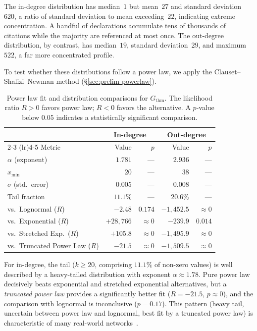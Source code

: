The in-degree distribution has median~$1$ but mean~$27$ and standard deviation~$620$, a ratio of standard deviation to mean exceeding~$22$, indicating extreme concentration. A handful of declarations accumulate tens of thousands of citations while the majority are referenced at most once. The out-degree distribution, by contrast, has median~$19$, standard deviation~$29$, and maximum~$522$, a far more concentrated profile.

To test whether these distributions follow a power law, we apply the Clauset--Shalizi--Newman method (\S\ref{sec:prelim-powerlaw}).

\begin{table}[ht]
\centering
\caption{Power law fit and distribution comparisons for $G_{\mathrm{thm}}$. The likelihood ratio $R > 0$ favors power law; $R < 0$ favors the alternative. A $p$-value below $0.05$ indicates a statistically significant comparison.}
\label{tab:thm-powerlaw}
\begin{tabular}{lrrrr}
\toprule
& \multicolumn{2}{c}{In-degree} & \multicolumn{2}{c}{Out-degree} \\
\cmidrule(lr){2-3} \cmidrule(lr){4-5}
Metric & Value & $p$ & Value & $p$ \\
\midrule
$\alpha$ (exponent)     & $1.781$ & --- & $2.936$ & --- \\
$x_{\min}$              & $20$    & --- & $38$    & --- \\
$\sigma$ (std.\ error)  & $0.005$ & --- & $0.008$ & --- \\
Tail fraction           & $11.1\%$ & --- & $20.6\%$ & --- \\
\midrule
vs.\ Lognormal ($R$)          & $-2.48$   & $0.174$   & $-1{,}452.5$ & $\approx 0$ \\
vs.\ Exponential ($R$)        & $+28{,}766$ & $\approx 0$ & $-239.9$ & $0.014$ \\
vs.\ Stretched Exp.\ ($R$)    & $+105.8$  & $\approx 0$ & $-1{,}495.9$ & $\approx 0$ \\
vs.\ Truncated Power Law ($R$) & $-21.5$  & $\approx 0$ & $-1{,}509.5$ & $\approx 0$ \\
\bottomrule
\end{tabular}
\end{table}

For in-degree, the tail ($k \ge 20$, comprising $11.1\%$ of non-zero values) is well described by a heavy-tailed distribution with exponent $\alpha \approx 1.78$. Pure power law decisively beats exponential and stretched exponential alternatives, but a \emph{truncated power law} provides a significantly better fit ($R = -21.5$, $p \approx 0$), and the comparison with lognormal is inconclusive ($p = 0.17$). This pattern (heavy tail, uncertain between power law and lognormal, best fit by a truncated power law) is characteristic of many real-world networks~\cite{clauset2009}.

